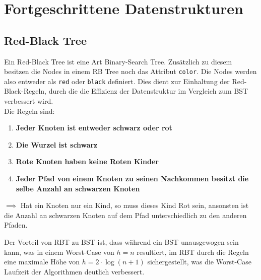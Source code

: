 \documentclass[
../../AuD-Zusammenfassung.tex,
]
{subfiles}
\begin{document}
\section{Fortgeschrittene Datenstrukturen}
\subsection{Red-Black Tree}
Ein Red-Black Tree ist eine Art Binary-Search Tree. Zusätzlich zu diesem besitzen die Nodes in einem RB Tree noch das Attribut \texttt{color}. Die Nodes werden also entweder als \texttt{red} oder \texttt{black} definiert. Dies dient zur Einhaltung der Red-Black-Regeln, durch die die Effizienz der Datenstruktur im Vergleich zum BST verbessert wird.\\
Die Regeln sind:
\begin{enumerate}
    \item \textbf{Jeder Knoten ist entweder schwarz oder rot}
    \item \textbf{Die Wurzel ist schwarz}
    \item \textbf{Rote Knoten haben keine Roten Kinder}
    \item \textbf{Jeder Pfad von einem Knoten zu seinen Nachkommen besitzt die selbe Anzahl an schwarzen Knoten}
\end{enumerate}
\begin{center}
    $\implies$ Hat ein Knoten nur ein Kind, so muss dieses Kind Rot sein, ansonsten ist die Anzahl an schwarzen Knoten auf dem Pfad unterschiedlich zu den anderen Pfaden.
\end{center}
Der Vorteil von RBT zu BST ist, dass während ein BST unausgewogen sein kann, was in einem Worst-Case von $h = n$ resultiert, im RBT durch die Regeln eine maximale Höhe von $h = 2\cdot \log (n + 1)$ sichergestellt, was die Worst-Case Laufzeit der Algorithmen deutlich verbessert.

\begin{minipage}[t]{0.5\textwidth}
    \centering
\end{minipage}
\end{document}
